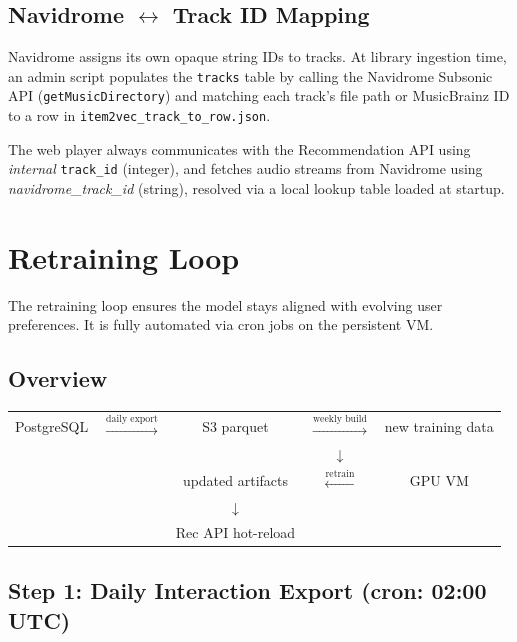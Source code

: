 \documentclass[11pt]{article}
\begin{document}
\subsection{Navidrome $\leftrightarrow$ Track ID Mapping}

Navidrome assigns its own opaque string IDs to tracks.  At library ingestion time, an
admin script populates the \texttt{tracks} table by calling the Navidrome Subsonic API
(\texttt{getMusicDirectory}) and matching each track's file path or MusicBrainz ID to a
row in \texttt{item2vec\_track\_to\_row.json}.

The web player always communicates with the Recommendation API using \emph{internal}
\texttt{track\_id} (integer), and fetches audio streams from Navidrome using
\emph{navidrome\_track\_id} (string), resolved via a local lookup table loaded at startup.

\section{Retraining Loop}

The retraining loop ensures the model stays aligned with evolving user preferences.
It is fully automated via cron jobs on the persistent VM.

\subsection{Overview}

\begin{center}
\begin{tabular}{ccccc}
PostgreSQL & $\xrightarrow{\text{daily export}}$ & S3 parquet &
$\xrightarrow{\text{weekly build}}$ & new training data \\
& & & $\downarrow$ & \\
& & updated artifacts & $\xleftarrow{\text{retrain}}$ & GPU VM \\
& & $\downarrow$ & & \\
& & Rec API hot-reload & & \\
\end{tabular}
\end{center}

\subsection{Step 1: Daily Interaction Export (cron: 02:00 UTC)}
\end{document}
